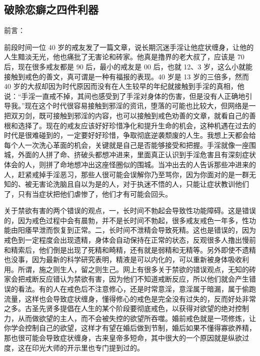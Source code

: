 \subsection{破除恋癖之四件利器}

前言：

前段时间一位 40 岁的戒友发了一篇文章，说长期沉迷手淫让他症状缠身，让他的人生黯淡无光，他也痛批了无害论和砖家。他真是撸界的老大叔了，应该是 70 后，现在很多戒友都是 90 后，最小的戒友是 00 后，也就 12、3 岁，这么小就能接触到戒色的善文，真可谓是一种有福报的表现。40 岁是 13 岁的三倍多，然而 40 岁的大叔却因为时代原因而没有在人生较早的年纪就接触到手淫的真相，他说：“手淫一直戒不掉，其间也感受到了手淫对身体的伤害，但是没有人正确地引导我。”现在这个时代很容易接触到邪淫的资讯，堕落的可能也比较大，但网络是一把双刃剑，既可接触到邪淫的内容，也可以接触到戒色劝善的文章，就看自己的善根和选择了。现在的戒友应该好好珍惜净化和提升生命的机会，这种机遇在过去的时代是很难碰到的，一定要好好珍惜，争取彻底逆袭颓废的人生。我想上天都会给每个人一次洗心革面的机会，关键就是自己是否能够接受和把握。手淫就像一座围城，外面的人拼了命、挤破头都想冲进来，里面真正认识到手淫危害且有深刻症状体会的人，则拼了命地想冲出这座怪圈似的围城。当冲出去的人告诉那些冲进来的人，赶紧戒掉手淫恶习，那些人很可能会误解你乃至骂你，因为你面对的是一群无知的、被无害论洗脑且自以为是的人，对于执迷不悟的人，只能让症状教训他们了，只有当症状把他们虐惨了，他们才有可能会回头。

关于禁欲有害的两个错误的观点，一，长时间不勃起会导致性功能障碍。这是错误的，因为戒色过程中会有晨勃，并不是长时间不勃起，很多戒友戒色一年多，性功能由阳痿早泄而恢复到正常。二，长时间不泄精会导致死精。这也是错误的，因为戒色到一定程度会出现遗精，身体会自动保持在正常的状态，反观很多人撸出慢前和精索后，他们倒是出现了死精和畸精，还有就是弱精和无精等。另外即使不遗精也没事，因为最新的科学研究表明，精液是可以内化的，可以重新被身体吸收利用。所谓，施之则生人，留之则生己。网上有很多关于禁欲的错误观点，无知的砖家会把戒断反应错认为禁欲有害，因为他们不知道戒断反应，所以他们就会产生错误的看法。有的人在戒色后不注意修心，还是时常意淫，意淫属于暗漏，属于偷跑流量，这样也会导致症状缠身，懂得修心的戒色是完全没有过失的，反而好处非常之多。古圣先贤多提倡在人生的某个阶段要彻底戒色，以获得对欲望的绝对控制力，从而做欲望的主人，而不会被失控的欲望所吞噬。婚前戒色就是一项修炼，让你学会控制自己的欲望，这样才有望在婚后做到节制，婚后如果不懂得寡欲养精，那也很可能会导致症状缠身，古来皇帝多短命，其中很大的一个原因就是纵欲过度，这在印光大师的开示里也专门提到过的。

